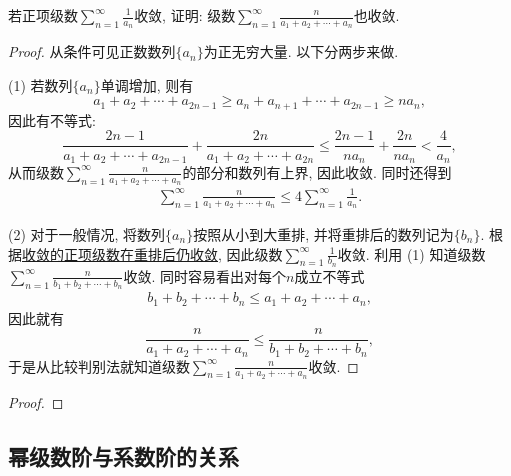 \documentclass[../../main.tex]{subfiles}
\begin{document}
\begin{example}
若正项级数$\sum\limits_{n=1}^{\infty}\frac{1}{a_n}$收敛, 证明: 级数$\sum\limits_{n=1}^{\infty}\frac{n}{a_1+a_2+\cdots+a_n}$也收敛.
\end{example}
\begin{proof}
从条件可见正数数列$\{a_n\}$为正无穷大量. 以下分两步来做.

(1) 若数列$\{a_n\}$单调增加, 则有
$$a_1+a_2+\cdots+a_{2n-1}\geqslant a_n+a_{n+1}+\cdots+a_{2n-1}\geqslant na_n,$$
因此有不等式:
$$\frac{2n-1}{a_1+a_2+\cdots+a_{2n-1}}+\frac{2n}{a_1+a_2+\cdots+a_{2n}}\leqslant \frac{2n-1}{na_n}+\frac{2n}{na_n}<\frac{4}{a_n},$$
从而级数$\sum\limits_{n=1}^{\infty}\frac{n}{a_1+a_2+\cdots+a_n}$的部分和数列有上界, 因此收敛. 同时还得到
\begin{align*}
\sum_{n=1}^{\infty}\frac{n}{a_1+a_2+\cdots+a_n}\leqslant 4\sum_{n=1}^{\infty}\frac{1}{a_n}.
\end{align*}

(2) 对于一般情况, 将数列$\{a_n\}$按照从小到大重排, 并将重排后的数列记为$\{b_n\}$. 根据\hyperref[theorem:Riemann重排定理]{收敛的正项级数在重排后仍收敛}, 因此级数$\sum\limits_{n=1}^{\infty}\frac{1}{b_n}$收敛. 利用 (1) 知道级数$\sum\limits_{n=1}^{\infty}\frac{n}{b_1+b_2+\cdots+b_n}$收敛. 同时容易看出对每个$n$成立不等式
\begin{align*}
b_1+b_2+\cdots+b_n\leqslant a_1+a_2+\cdots+a_n,
\end{align*}
因此就有
$$\frac{n}{a_1+a_2+\cdots+a_n}\leqslant \frac{n}{b_1+b_2+\cdots+b_n},$$
于是从比较判别法就知道级数$\sum\limits_{n=1}^{\infty}\frac{n}{a_1+a_2+\cdots+a_n}$收敛.

\end{proof}

\begin{example}

\end{example}
\begin{proof}


\end{proof}





\subsection{幂级数阶与系数阶的关系}
\end{document}
